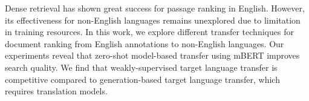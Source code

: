 Dense retrieval has shown great success for passage ranking in English. However, its effectiveness for non-English languages remains unexplored due to limitation in training resources. In this work, we explore different transfer techniques for document ranking from English annotations to non-English languages. Our experiments reveal that zero-shot model-based transfer using mBERT improves search quality. We find that weakly-supervised target language transfer is competitive compared to generation-based target language transfer, which requires translation models.
